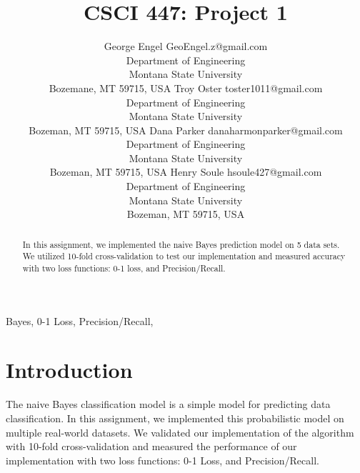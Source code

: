 \documentclass[twoside,11pt]{article}
\begin{document}
\title{CSCI 447: Project 1}

\author{\name George Engel \email GeoEngel.z@gmail.com \\
       \addr Department of Engineering\\
       Montana State University\\
       Bozemane, MT 59715, USA
       \AND
       \name Troy Oster \email toster1011@gmail.com \\
       \addr Department of Engineering\\
       Montana State University\\
       Bozeman, MT 59715, USA
       \AND
       \name Dana Parker \email danaharmonparker@gmail.com \\
       \addr Department of Engineering\\
       Montana State University\\
       Bozeman, MT 59715, USA
       \AND
       \name Henry Soule \email hsoule427@gmail.com \\
       \addr Department of Engineering\\
       Montana State University\\
       Bozeman, MT 59715, USA}


\maketitle

\begin{abstract}%
In this assignment, we implemented the naive Bayes prediction model on 5 data sets. We utilized 10-fold cross-validation to test our implementation and measured accuracy with two loss functions: 0-1 loss, and Precision/Recall.

\end{abstract}

\begin{keywords}
    Bayes, 0-1 Loss, Precision/Recall, 
\end{keywords}

\section{Introduction}
The naive Bayes classification model is a simple model for predicting data classification. In this assignment, we implemented this probabilistic model on multiple real-world datasets. We validated our implementation of the algorithm with 10-fold cross-validation and measured the performance of our implementation with two loss functions: 0-1 Loss, and Precision/Recall.
\end{document}
